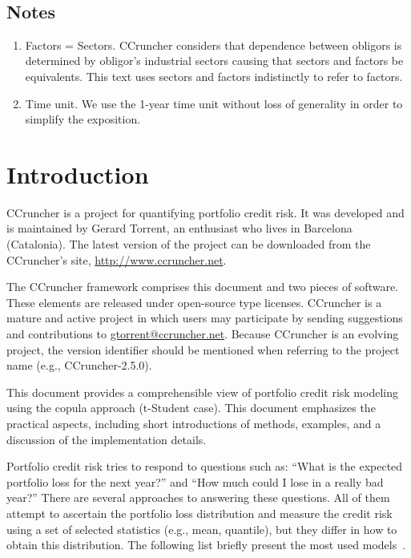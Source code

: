 \documentclass[11pt,fleqn]{book} %
\def\numversion{2.5.0}
\begin{document}
\glsaddall
\printglossary[style=super3colleft]
~\vfill
\section*{Notes}
\begin{enumerate}[leftmargin=*]
	\itemsep 0.5em
	\item Factors = Sectors. CCruncher considers that dependence between 
	obligors is determined by obligor's industrial sectors causing that 
	sectors and factors be equivalents. This text uses sectors and factors 
	indistinctly to refer to factors.
	\item Time unit. We use the 1-year time unit without loss of generality 
	in order to simplify the exposition.
\end{enumerate}
\cleardoublepage
\pagestyle{fancy}


\chapter{Introduction}

CCruncher is a project for quantifying portfolio credit risk. 
It was developed and is maintained by Gerard Torrent, an enthusiast  
who lives in Barcelona (Catalonia). The latest version 
of the project can be downloaded from the CCruncher's site, 
\url{http://www.ccruncher.net}.

The CCruncher framework comprises this document and two pieces of software. 
These elements are released under open-source type licenses. 
CCruncher is a mature and active project in which users may participate by 
sending suggestions and contributions to \href{mailto:gtorrent@ccruncher.net}
{gtorrent@ccruncher.net}. Because CCruncher is an evolving project, the version
identifier should be mentioned when referring to the project name 
(e.g., CCruncher-\numversion).

This document provides a comprehensible view of portfolio credit risk modeling 
using the copula approach (t-Student case). This document emphasizes the 
practical aspects, including short introductions of methods, examples, and 
a discussion of the implementation details. 

Portfolio credit risk tries to respond to questions such as: ``What is the 
expected portfolio loss for the next year?'' and ``How much could I 
lose in a really bad year?'' There are several approaches to answering these 
questions. All of them attempt to ascertain the portfolio loss distribution 
and measure the credit risk using a set of selected statistics (e.g., mean, 
quantile), but they differ in how to obtain this distribution. The following 
list briefly present the most used 
models~\cite{crouhy:2000,brereton:2012,mcneil:2003}\cite[chap. 2.4]{bluhm:2002}. 
\end{document}
